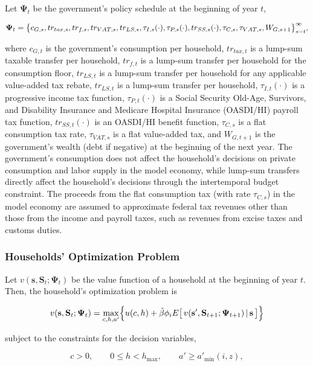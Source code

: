 \documentclass[11pt,leqno,fleqn]{article}
\newcommand{\be}{\vspace{-1em}\begin{singlespace}\begin{equation}}
\newcommand{\ee}{\end{equation}\end{singlespace}}
\begin{document}
Let $\mathbf{\Psi}_{t}$ be the government's policy schedule at the beginning of year $t$,

\be \mathbf{\Psi}_{t}=\bigl\{c_{G,s},tr_{tax,s},tr_{f,s},tr_{VAT,s},tr_{LS,s},\tau_{I,s}(\cdot),\tau_{P,s}(\cdot),tr_{SS,s}(\cdot),\tau_{C,s},\tau_{VAT,s},W_{G,s+1}\bigr\}_{s=t}^{\infty}, \notag \ee

where $c_{G,t}$ is the government's consumption per household, $tr_{tax,t}$ is a lump-sum taxable transfer per household, $tr_{f,t}$ is a lump-sum transfer per household for the consumption floor, $tr_{LS,t}$ is a lump-sum transfer per household for any applicable value-added tax rebate, $tr_{LS,t}$ is a lump-sum transfer per household, $\tau_{I,t}(\cdot)$ is a progressive income tax function, $\tau_{P,t}(\cdot)$ is a Social Security Old-Age, Survivors, and Disability Insurance and Medicare Hospital Insurance (OASDI/HI) payroll tax function, $tr_{SS,t}(\cdot)$ is an OASDI/HI benefit function, $\tau_{C,s}$ is a flat consumption tax rate, $\tau_{VAT,s}$ is a flat value-added tax, and $W_{G,t+1}$ is the government's wealth (debt if negative) at the beginning of the next year. The government's consumption does not affect the household's decisions on private consumption and labor supply in the model economy, while lump-sum transfers directly affect the household's decisions through the intertemporal budget constraint. The proceeds from the flat consumption tax (with rate $\tau_{C,s}$) in the model economy are assumed to approximate federal tax revenues other than those from the income and payroll taxes, such as revenues from excise taxes and customs duties.


\subsubsection{Households' Optimization Problem}

Let $v(\mathbf{s},\mathbf{S}_{t};\mathbf{\Psi}_{t})$ be the value function of a household at the beginning of year $t$. Then, the household's optimization problem is

\be v(\mathbf{s},\mathbf{S}_{t};\mathbf{\Psi}_{t}) = \max_{c,h,a'}\Bigl\{u(c,h)+\tilde{\beta}\phi_{i}E\bigl[\,
	v(\mathbf{s}',\mathbf{S}_{t+1};\mathbf{\Psi}_{t+1})\,|\,\mathbf{s}\,\bigr]\Bigr\} \label{E:obj_fun} \ee

subject to the constraints for the decision variables,
\be	c>0,\qquad 0\leq h<h_{\max},\qquad a'\geq a'_{\min}(i,z), \ee
\end{document}
